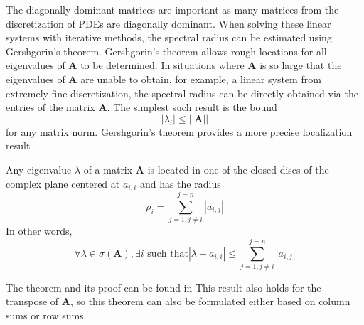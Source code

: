 The diagonally dominant matrices are important as many matrices from the discretization of PDEs are diagonally dominant. When solving these linear systems with iterative methods, the spectral radius can be estimated using Gershgorin's theorem. Gershgorin's theorem allows rough locations for all eigenvalues of $\boldsymbol{A}$ to be determined. In situations where $\boldsymbol{A}$ is so large that the eigenvalues of $\boldsymbol{A}$ are unable to obtain, for example, a linear system from extremely fine discretization, the spectral radius can be directly obtained via the entries of the matrix $\boldsymbol{A}$. The simplest such result is the bound \begin{equation}
    |\lambda_i| \leq ||\boldsymbol{A}||
\end{equation}
for any matrix norm. Gershgorin's theorem provides a more precise localization result
\begin{theorem}[Gershgorin]
Any eigenvalue $\lambda$ of a matrix $\boldsymbol{A}$ is located in one of the closed discs of the complex plane centered at $a_{i, i}$ and has the radius
\begin{equation}
    \rho_i = \sum_{j = 1, j \neq i}^{j=n}|a_{i,j}|
\end{equation}
In other words,
\begin{equation}
    \forall \lambda \in \sigma(\boldsymbol{A}), \exists  i \text{ such that} |\lambda - a_{i,i}| \leq \sum_{j = 1, j \neq i}^{j = n}|a_{i,j}|
\end{equation}
\end{theorem}
The theorem and its proof can be found in \cite{doi:10.1137/1.9780898718003}
This result also holds for the transpose of $\boldsymbol{A}$, so this theorem can also be formulated either based on column sums or row sums.
